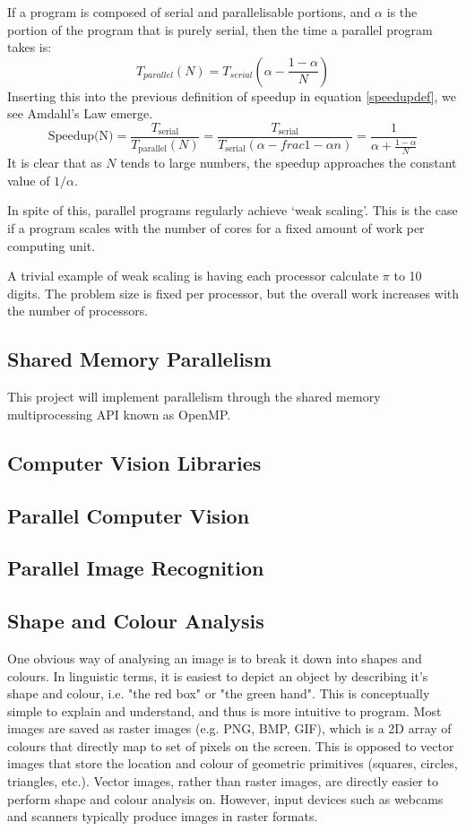 \documentclass[../main.tex]{subfiles}
\begin{document}
    If a program is composed of serial and parallelisable portions, and $\alpha$ is the portion of the program that is purely serial, then the time a parallel program takes is:
    \begin{equation}
      T_{parallel}(N) = T_{serial}\left(\alpha-\frac{1-\alpha}{N}\right)
    \end{equation}
    Inserting this into the previous definition of speedup in equation \ref{speedupdef}, we see Amdahl's Law emerge.
    \begin{equation}
      \text{Speedup(N)} = \frac{T_\text{serial}}{T_\text{parallel}(N)} = \frac{T_\text{serial}}{T_\text{serial}\left(\alpha-frac{1-\alpha}{n}\right)} = \frac{1}{\alpha+\frac{1-\alpha}{N}}
      \label{amdahl}
    \end{equation}
    It is clear that as $N$ tends to large numbers, the speedup approaches the constant value of $1/\alpha$.  
    
    In spite of this, parallel programs regularly achieve `weak scaling'.
    This is the case if a program scales with the number of cores for a fixed amount of work per computing unit.


    A trivial example of weak scaling is having each processor calculate $\pi$ to 10 digits.
    The problem size is fixed per processor, but the overall work increases with the number of processors.
    \subsection{Shared Memory Parallelism}
      This project will implement parallelism through the shared memory multiprocessing API known as OpenMP.
    \subsection{Computer Vision Libraries}
    \subsection{Parallel Computer Vision}
    \subsection{Parallel Image Recognition}
    \subsection{Shape and Colour Analysis}
    One obvious way of analysing an image is to break it down into shapes and colours.
    In linguistic terms, it is easiest to depict an object by describing it's shape and colour, i.e. "the red box" or "the green hand".
    This is conceptually simple to explain and understand, and thus is more intuitive to program.
    Most images are saved as raster images (e.g. PNG, BMP, GIF), which is a 2D array of colours that directly map to set of pixels on the screen.
    This is opposed to vector images that store the location and colour of geometric primitives (squares, circles, triangles, etc.).
    Vector images, rather than raster images, are directly easier to perform shape and colour analysis on.
    However, input devices such as webcams and scanners typically produce images in raster formats.
\end{document}

